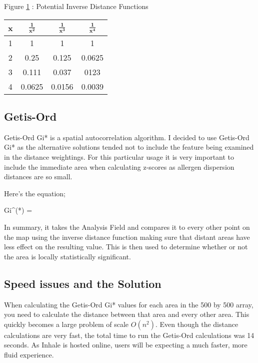 \begin{table}
\begin{center}
Figure \ref{table:dist} : Potential Inverse Distance Functions\\\label{table:dist}
\begin{tabular}{|c|c|c|c|}\hline\hline
x&$\mathbf{\frac{1}{x^2}}$&$\mathbf{\frac{1}{x^3}}$&$\mathbf{\frac{1}{x^4}}$\\\hline
1&1&1&1\\
2&0.25&0.125&0.0625\\
3&0.111&0.037&0123\\
4&0.0625&0.0156&0.0039\\\hline\hline
\end{tabular}
\end{center}
\end{table}


\subsection{Getis-Ord}

Getis-Ord Gi* is a spatial autocorrelation algorithm. I decided to use Getis-Ord Gi* as the alternative solutions tended not to include the feature being examined in the distance weightings. For this particular usage it is very important to include the immediate area when calculating z-scores as allergen dispersion distances are so small.

Here's the equation;

\begin{myequation}%
Gi^(*) = 
\end{myequation}

In summary, it takes the Analysis Field and compares it to every other point on the map using the inverse distance function making sure that distant areas have less effect on the resulting value. This is then used to determine whether or not the area is locally statistically significant.

\subsection{Speed issues and the Solution}

When calculating the Getis-Ord Gi* values for each area in the 500 by 500 array, you need to calculate the distance between that area and every other area. This quickly becomes a large problem of scale $O(n^2)$. Even though the distance calculations are very fast, the total time to run the Getis-Ord calculations was 14 seconds. As Inhale is hosted online, users will be expecting a much faster, more fluid experience.\\

